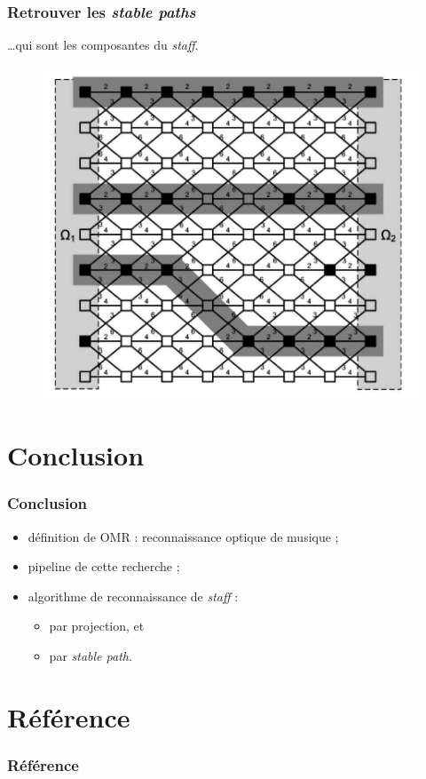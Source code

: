 \documentclass{beamer}
\begin{document}
\begin{frame}
    \frametitle{Retrouver les \textit{stable paths}}
    \dots qui sont les composantes du \textit{staff}.
    \begin{figure}
        \includegraphics[height=0.5\textheight]{img/pixel-graph.png}
    \end{figure}
\end{frame}

\section{Conclusion}
\begin{frame}
    \frametitle{Conclusion}
    \begin{itemize}
        \item définition de OMR : reconnaissance optique de musique ;
        \item pipeline de cette recherche ;
        \item algorithme de reconnaissance de \textit{staff} :
        \begin{itemize}
            \item par projection, et
            \item par \textit{stable path}.
        \end{itemize}
    \end{itemize}
\end{frame}

\section*{Référence}
\begin{frame}
    \frametitle{Référence}
    
    
    \nocite{*}
\end{frame}
\end{document}
